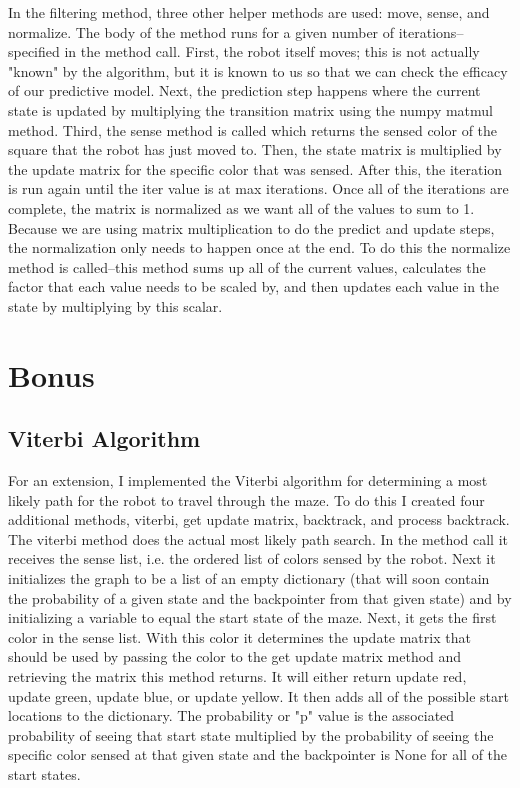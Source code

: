 \documentclass{article}
\begin{document}
In the filtering method, three other helper methods are used: move, sense, and normalize. The body of the method runs for a given number of iterations--specified in the method call. First, the robot itself moves; this is not actually "known" by the algorithm, but it is known to us so that we can check the efficacy of our predictive model. Next, the prediction step happens where the current state is updated by multiplying the transition matrix using the numpy matmul method. Third, the sense method is called which returns the sensed color of the square that the robot has just moved to. Then, the state matrix is multiplied by the update matrix for the specific color that was sensed. After this, the iteration is run again until the iter value is at max iterations. Once all of the iterations are complete, the matrix is normalized as we want all of the values to sum to 1. Because we are using matrix multiplication to do the predict and update steps, the normalization only needs to happen once at the end. To do this the normalize method is called--this method sums up all of the current values, calculates the factor that each value needs to be scaled by, and then updates each value in the state by multiplying by this scalar.

\section{Bonus}
\subsection{Viterbi Algorithm}
For an extension, I implemented the Viterbi algorithm for determining a most likely path for the robot to travel through the maze. To do this I created four additional methods, viterbi, get update matrix, backtrack, and process backtrack. The viterbi method does the actual most likely path search. In the method call it receives the sense list, i.e. the ordered list of colors sensed by the robot. Next it initializes the graph to be a list of an empty dictionary (that will soon contain the probability of a given state and the backpointer from that given state) and by initializing a variable to equal the start state of the maze. Next, it gets the first color in the sense list. With this color it determines the update matrix that should be used by passing the color to the get update matrix method and retrieving the matrix this method returns. It will either return update red, update green, update blue, or update yellow. It then adds all of the possible start locations to the dictionary. The probability or "p" value is the associated probability of seeing that start state multiplied by the probability of seeing the specific color sensed at that given state and the backpointer is None for all of the start states. 
\end{document}
